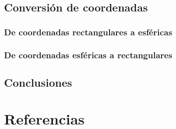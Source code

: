 \documentclass[letterpaper,14pt]{extreport} %
\begin{document}
    \section{Conversión de coordenadas}
      \subsection{De coordenadas rectangulares a esféricas}
          

      \subsection{De coordenadas esféricas a rectangulares}
          

    \section{Conclusiones}
      

  \chapter{Referencias}
    
\end{document}

